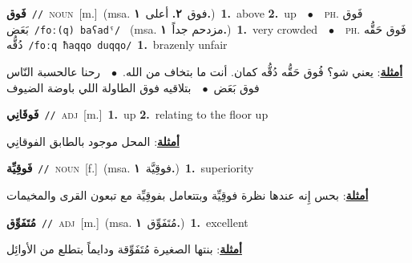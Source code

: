 \documentclass[10pt,a4paper,twoside]{article} %
\begin{document}
\begin{multicols}{2}
{\setlength\topsep{0pt}\textbf{\foreignlanguage{arabic}{فَوق}}\ {\color{gray}\texttt{//}\color{black}}\ \textsc{noun}\ [m.]\ \color{gray}(msa. \foreignlanguage{arabic}{فوق}~\foreignlanguage{arabic}{\textbf{٢.}}  \foreignlanguage{arabic}{أعلى}~\foreignlanguage{arabic}{\textbf{١.}})\color{black}\ \textbf{1.}~above  \textbf{2.}~up\ \ $\bullet$\ \ \textsc{ph.} \color{gray} \foreignlanguage{arabic}{فَوق بَعَض}\color{black}\ {\color{gray}\texttt{/{\sffamily foː(q) baʕadˤ}/}\color{black}}\ \color{gray} (msa. \foreignlanguage{arabic}{مزدحم جداً}~\foreignlanguage{arabic}{\textbf{١.}})\color{black}\ \textbf{1.}~very crowded\ \ $\bullet$\ \ \textsc{ph.} \color{gray} \foreignlanguage{arabic}{فَوق حَقُّه دُقُّه}\color{black}\ {\color{gray}\texttt{/{\sffamily foːq ħaqqo duqqo}/}\color{black}}\ \textbf{1.}~brazenly unfair\  \begin{flushright}\color{gray}\foreignlanguage{arabic}{\textbf{\underline{\foreignlanguage{arabic}{أمثلة}}}: يعني شو؟ فُوق حَقُّه دُقُّه كمان. أنت ما بتخاف من الله.\ $\bullet$\ \  رحنا عالحسبة النّاس فوق بَعَض\ $\bullet$\ \  بتلاقيه فوق الطاولة اللي باوضة الضيوف}\end{flushright}\color{black}} \vspace{2mm}

{\setlength\topsep{0pt}\textbf{\foreignlanguage{arabic}{فَوقَانِي}}\ {\color{gray}\texttt{//}\color{black}}\ \textsc{adj}\ [m.]\ \textbf{1.}~up  \textbf{2.}~relating to the floor up\  \begin{flushright}\color{gray}\foreignlanguage{arabic}{\textbf{\underline{\foreignlanguage{arabic}{أمثلة}}}: المحل موجود بالطابق الفوقانِي}\end{flushright}\color{black}} \vspace{2mm}

{\setlength\topsep{0pt}\textbf{\foreignlanguage{arabic}{فَوقِيِّة}}\ {\color{gray}\texttt{//}\color{black}}\ \textsc{noun}\ [f.]\ \color{gray}(msa. \foreignlanguage{arabic}{فوقِيَّة}~\foreignlanguage{arabic}{\textbf{١.}})\color{black}\ \textbf{1.}~superiority\  \begin{flushright}\color{gray}\foreignlanguage{arabic}{\textbf{\underline{\foreignlanguage{arabic}{أمثلة}}}: بحس إِنه عندها نظرة فوقِيِّة وبتتعامل بفوقِيِّة مع تبعون القرى والمخيمات}\end{flushright}\color{black}} \vspace{2mm}

{\setlength\topsep{0pt}\textbf{\foreignlanguage{arabic}{مُتَفَوِّق}}\ {\color{gray}\texttt{//}\color{black}}\ \textsc{adj}\ [m.]\ \color{gray}(msa. \foreignlanguage{arabic}{مُتَفَوِّق}~\foreignlanguage{arabic}{\textbf{١.}})\color{black}\ \textbf{1.}~excellent\  \begin{flushright}\color{gray}\foreignlanguage{arabic}{\textbf{\underline{\foreignlanguage{arabic}{أمثلة}}}: بنتها الصغيرة مُتَفَوِّقة ودايماً بتطلع من الأوائِل}\end{flushright}\color{black}} \vspace{2mm}


\end{multicols}
\end{document}
